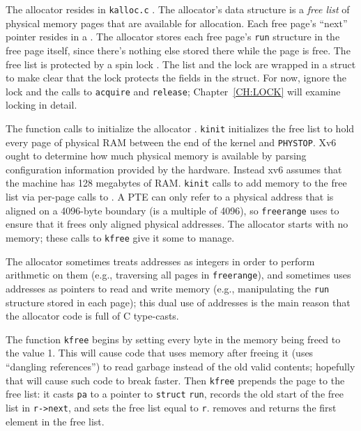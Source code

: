 The allocator resides in {\tt kalloc.c} .
The allocator's data structure is a
\textit{free list}
of physical memory pages that are available
for allocation.
Each free page's ``next'' pointer resides in a
.
The allocator stores each free page's
\lstinline{run}
structure in the free page itself,
since there's nothing else stored there
while the page is free.
The free list is
protected by a spin lock
.
The list and the lock are wrapped in a struct
to make clear that the lock protects the fields
in the struct.
For now, ignore the lock and the calls to
\lstinline{acquire}
and
\lstinline{release};
Chapter~\ref{CH:LOCK} will examine
locking in detail.

The function
calls
to initialize the allocator
.
\lstinline{kinit}
initializes the free list to hold
every page of physical RAM between the end of the kernel and {\tt PHYSTOP}.
Xv6 ought to determine how much physical
memory is available by parsing configuration information 
provided by the hardware.
Instead xv6 assumes that the machine has
128 megabytes of RAM.
\lstinline{kinit}
calls
to add memory to the free list via per-page calls to
.
A PTE can only refer to a physical address that is aligned
on a 4096-byte boundary (is a multiple of 4096), so
\lstinline{freerange}
uses
to ensure that it frees only aligned physical addresses.
The allocator starts with no memory;
these calls to
\lstinline{kfree}
give it some to manage.

The allocator sometimes treats addresses as integers
in order to perform arithmetic on them (e.g.,
traversing all pages in
\lstinline{freerange}),
and sometimes uses addresses as pointers to read and
write memory (e.g., manipulating the
\lstinline{run}
structure stored in each page);
this dual use of addresses is the main reason that the
allocator code is full of C type-casts.

The function
\lstinline{kfree}
begins by setting every byte in the
memory being freed to the value 1.
This will cause code that uses memory after freeing it
(uses ``dangling references'')
to read garbage instead of the old valid contents;
hopefully that will cause such code to break faster.
Then
\lstinline{kfree}
prepends the page to the free list:
it casts
\lstinline{pa}
to a pointer to
\lstinline{struct}
\lstinline{run},
records the old start of the free list in
\lstinline{r->next},
and sets the free list equal to
\lstinline{r}.
removes and returns the first element in the free list.

